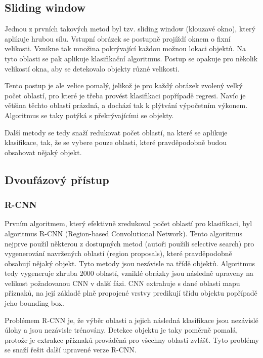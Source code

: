 \subsection{Sliding window}

Jednou z prvních takových metod byl tzv. sliding window (klouzavé okno), který
aplikuje hrubou sílu. Vstupní obrázek se postupně projíždí oknem o fixní
velikosti. Vznikne tak množina pokrývající každou možnou lokaci objektů. Na
tyto oblasti se pak aplikuje klasifikační algoritmus. Postup se opakuje pro
několik velikostí okna, aby se detekovalo objekty různé velikosti.

Tento postup je ale velice pomalý, jelikož je pro každý obrázek zvolený velký
počet oblastí, pro které je třeba provést klasifikaci popřípadě regresi. Navíc
je většina těchto oblastí prázdná, a dochází tak k plýtvání výpočetním výkonem.
Algoritmus se taky potýká s překrývajícími se objekty.

Další metody se tedy snaží redukovat počet oblastí, na které se aplikuje
klasifikace, tak, že se vybere pouze oblasti, které pravděpodobně budou
obsahovat nějaký objekt.

\subsection{Dvoufázový přístup}

\subsubsection{R-CNN}
Prvním algoritmem, který efektivně zredukoval počet oblastí pro klasifikaci,
byl algoritmus R-CNN (Region-based Convolutional Network). \cite{r-cnn} Tento
algoritmus nejprve použil některou z dostupných metod (autoři použili selective
search) pro vygenerování navržených oblastí (region proposals), které
pravděpodobně obsahují nějaký objekt. Tyto metody jsou nezávisle na třídě
objektů. Algoritmus tedy vygeneruje zhruba 2000 oblastí, vzniklé obrázky jsou
následně upraveny na velikost požadovanou CNN v další fázi. CNN extrahuje s
dané oblasti mapu příznaků, na její základě plně propojené vrstvy predikují
třídu objektu popřípadě jeho bounding box.

Problémem R-CNN je, že výběr oblasti a jejich následná klasifikace jsou
nezávislé úlohy a jsou nezávisle trénovány. Detekce objektu je taky poměrně
pomalá, protože je extrakce příznaků prováděná pro všechny oblasti zvlášť. Tyto
problémy se snaží řešit další upravené verze R-CNN.

